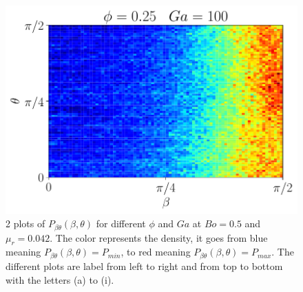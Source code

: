 \begin{figure}[h!]
    \includegraphics[height =\size]{image/N_10/beta/2DMAP_beta_theta_dmin_10_Bo0_5PHI0_25mu_r0_042Ga100.pdf}
    \caption{2 plots of $P_{\beta\theta}(\beta,\theta)$ for different $\phi$ and $Ga$ at $Bo = 0.5$ and $\mu_r = 0.042$. The color represents the density, it goes from blue meaning $P_{\beta\theta}(\beta,\theta)= P_{min}$, to red meaning $P_{\beta\theta}(\beta,\theta) = P_{max}$. The different plots are label from left to right and from top to bottom with the letters (a) to (i).} 
\end{figure} 
